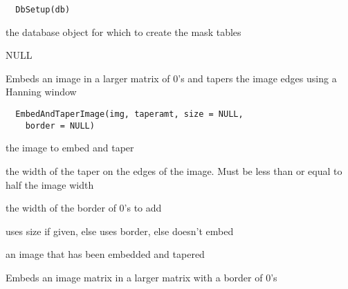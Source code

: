 \documentclass[a4paper]{book}
\begin{document}
%
\begin{Usage}
\begin{verbatim}
  DbSetup(db)
\end{verbatim}
\end{Usage}
%
\begin{Arguments}
\begin{ldescription}
\item[\code{db}] the database object for which to create the
mask tables
\end{ldescription}
\end{Arguments}
%
\begin{Value}
NULL
\end{Value}
%
\begin{Description}\relax
Embeds an image in a larger matrix of 0's and tapers the
image edges using a Hanning window
\end{Description}
%
\begin{Usage}
\begin{verbatim}
  EmbedAndTaperImage(img, taperamt, size = NULL,
    border = NULL)
\end{verbatim}
\end{Usage}
%
\begin{Arguments}
\begin{ldescription}
\item[\code{img}] the image to embed and taper

\item[\code{taperamt}] the width of the taper on the edges of
the image.  Must be less than or equal to half the image
width

\item[\code{border}] the width of the border of 0's to add
\end{ldescription}
\end{Arguments}
%
\begin{Details}\relax
uses size if given, else uses border, else doesn't embed
\end{Details}
%
\begin{Value}
an image that has been embedded and tapered
\end{Value}
%
\begin{Description}\relax
Embeds an image matrix in a larger matrix with a border
of 0's
\end{Description}
\end{document}
